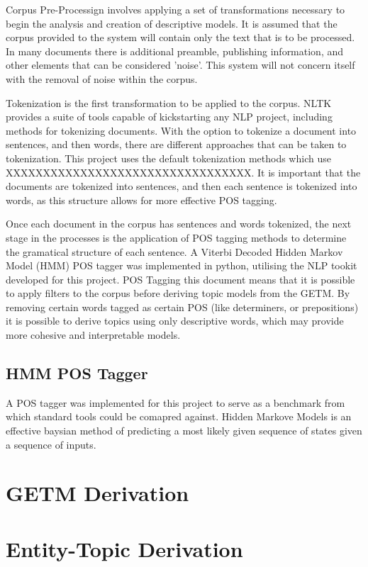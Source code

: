 \documentclass[10pt]{report}
\begin{document}
Corpus Pre-Processign involves applying a set of transformations necessary to begin the analysis and creation of descriptive models. It is assumed that the corpus provided to the system will contain only the text that is to be processed. In many documents there is additional preamble, publishing information, and other elements that can be considered 'noise'. This system will not concern itself with the removal of noise within the corpus.

Tokenization is the first transformation to be applied to the corpus. NLTK provides a suite of tools capable of kickstarting any NLP project, including methods for tokenizing documents. With the option to tokenize a document into sentences, and then words, there are different approaches that can be taken to tokenization. This project uses the default tokenization methods which use XXXXXXXXXXXXXXXXXXXXXXXXXXXXXXXXX. It is important that the documents are tokenized into sentences, and then each sentence is tokenized into words, as this structure allows for more effective POS tagging.

Once each document in the corpus has sentences and words tokenized, the next stage in the processes is the application of POS tagging methods to determine the gramatical structure of each sentence. A Viterbi Decoded Hidden Markov Model (HMM) POS tagger was implemented in python, utilising the NLP tookit developed for this project. POS Tagging this document means that it is possible to apply filters to the corpus before deriving topic models from the GETM. By removing certain words tagged as certain POS (like determiners, or prepositions) it is possible to derive topics using only descriptive words, which may provide more cohesive and interpretable models.

\subsection{HMM POS Tagger}
A POS tagger was implemented for this project to serve as a benchmark from which standard tools could be comapred against. Hidden Markove Models is an effective baysian method of predicting a most likely given sequence of states given a sequence of inputs.

\section{GETM Derivation}

\section{Entity-Topic Derivation}
\end{document}
